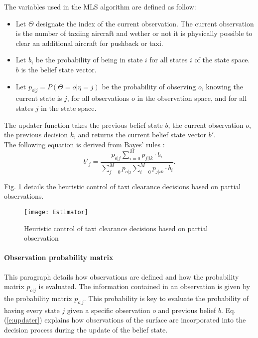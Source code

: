 \documentclass[letterpaper]{article}
\begin{document}
The variables used in the MLS algorithm are defined as follow:
\begin{itemize}
\item Let $\Theta$ designate the index of the current observation. The current observation is the number of 
taxiing aircraft and wether or not it is physically possible to clear an additional aircraft for pushback or taxi.
\item Let $b_i$ be the probability of being in state $i$ for all states $i$ of the state space. $b$ is the belief state vector.
\item Let $p_{o|j} = P(\Theta=o|\eta=j)$ be the probability of observing $o$, knowing the current state is $j$, for all observations $o$ in the observation space, and for all states $j$ in the state space.
\end{itemize}
The updater function takes the previous belief state $b$, the current observation $o$, the previous decision $k$, and returns the current belief state vector  $b'$.\\ The following equation is derived from Bayes' rules \cite{Littman1994}:
\begin{equation}
  \label{e:updater}
 b'_{j} = \frac{p_{o|j} \displaystyle\sum_{i=0}^M p_{j|ik} \cdot b_{i} }{ \displaystyle\sum_{j=0}^M p_{o|j} \displaystyle\sum_{i=0}^M p_{j|ik} \cdot b_{i}}.
 \end{equation}

Fig. \ref{estimator} details the heuristic control of taxi clearance decisions based on partial observations.

\begin{figure}[ht]
\centering
\texttt{[image: Estimator]}
\caption{Heuristic control of taxi clearance decisions based on partial observation}
\label{estimator}
\end{figure}

\paragraph{Observation probability matrix}

This paragraph details how observations are defined and how  the probability matrix $p_{o|j}$ is evaluated.
The information contained in an observation is given by the probability matrix $p_{o|j}$. This probability is key to evaluate the probability of having every state $j$ given a specific observation $o$ and previous belief $b$. Eq. (\ref{e:updater}) explains how observations of the surface are incorporated into the decision process during the update of the belief state.
\end{document}
